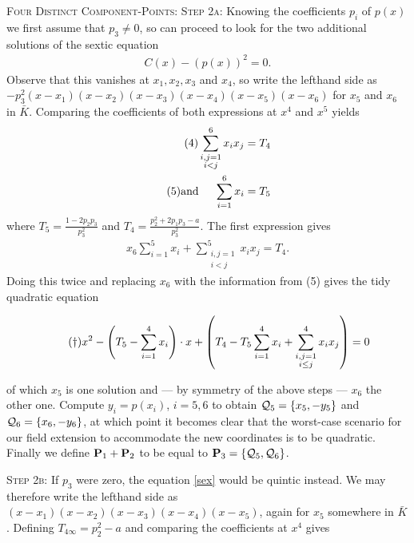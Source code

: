 \begin{case} {\scshape Four Distinct Component-Points:}
	{\scshape Step 2a:} Knowing the coefficients $p_i$ of $p(x)$ we first assume that $p_3 \neq 0$, so can proceed to look for the two additional solutions of the sextic equation
	\begin{align*}
		\tag{$\ast$} \label{sex} C(x)-\left(p(x)\right)^2 = 0.
	\end{align*}
	Observe that this vanishes at $x_1, x_2, x_3$ and $x_4$, so write the lefthand side as $-p_3^2(x-x_1)(x-x_2)(x-x_3)(x-x_4)(x-x_5)(x-x_6)$ for $x_5$ and $x_6$ in $\bar K$. Comparing the coefficients of both expressions at $x^4$ and $x^5$ yields
	\begin{align*}
		\label{four} \tag{4} \sum_{\substack{i,j=1\\i<j}}^6 x_i x_j &= T_4\\
		\tag{5} \text{and\hspace{5mm}} \sum_{i=1}^6 x_i &= T_5\\
	\end{align*}
	where $T_5 = \frac{1-2 p_2 p_3}{p_3^2}$ and $T_4 = \frac{p_2^2+2 p_1 p_3-a}{p_3^2}$.
	The first expression gives
	\begin{align*}
		x_6 \sum_{i=1}^5 x_i + \sum_{\substack{i,j=1\\i<j}}^5 x_i x_j = T_4.
	\end{align*}
	Doing this twice and replacing $x_6$ with the information from (5) gives the tidy quadratic equation

	\vspace{-3mm}
	\fline
	\begin{align*}
		\tag{$\dag$} \label{dagger} x^2 - \left(T_5 - \sumfo \right) \cdot x+ \left(T_4 - T_5 \sumfo + \sum_{\substack{i,j=1\\i\leq j}}^4 x_i x_j \right) = 0
	\end{align*}
	\fline

	of which $x_5$ is one solution and --- by symmetry of the above steps --- $x_6$ the other one. Compute $y_i=p(x_i)$, $i=5,6$ to obtain $\q_5 = \{ x_5, -y_5 \}$ and $\q_6 = \{ x_6, -y_6 \}$, at which point it becomes clear that the worst-case scenario for our field extension to accommodate the new coordinates is to be quadratic. Finally we define $\P_1 + \P_2$ to be equal to $\P_3 = \{ \q_5, \q_6 \}$.

	{\scshape Step 2b:} If $p_3$ were zero, the equation \eqref{sex} would be quintic instead. We may therefore write the lefthand side as $(x-x_1)(x-x_2)(x-x_3)(x-x_4)(x-x_5)$, again for $x_5$ somewhere in $\bar K$. Defining $T_{4\infty}=p_2^2 - a$ and comparing the coefficients at $x^4$ gives


\end{case}
